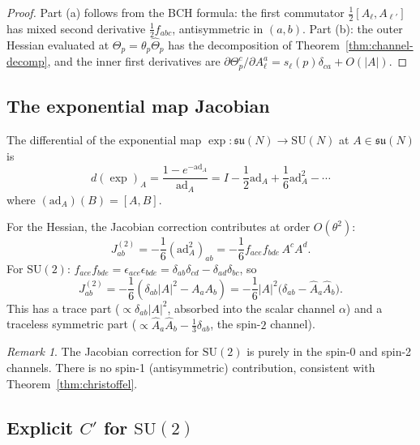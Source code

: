 \documentclass[11pt,a4paper]{article}
\theoremstyle{plain}
\theoremstyle{definition}
\theoremstyle{remark}
\newtheorem{remark}[theorem]{Remark}
\newcommand{\SU}{\mathrm{SU}}
\newcommand{\su}{\mathfrak{su}}
\newcommand{\ad}{\mathrm{ad}}
\begin{document}
\begin{proof}
Part (a) follows from the BCH formula: the first commutator
$\frac{1}{2}[A_\ell, A_{\ell'}]$ has mixed second derivative
$\frac{1}{2}f_{abc}$, antisymmetric in $(a,b)$. Part (b): the
outer Hessian evaluated at $\Theta_p = \theta_p\hat\Theta_p$
has the decomposition of Theorem~\ref{thm:channel-decomp}, and
the inner first derivatives are
$\partial\Theta_p^c/\partial A_\ell^a = s_\ell(p)\delta_{ca}
+ O(|A|)$.
\end{proof}


\subsection{The exponential map Jacobian}

The differential of the exponential map
$\exp: \su(N) \to \SU(N)$ at $A \in \su(N)$ is
\begin{equation}\label{eq:dexp}
d(\exp)_A = \frac{1 - e^{-\ad_A}}{\ad_A}
= I - \frac{1}{2}\ad_A + \frac{1}{6}\ad_A^2 - \cdots
\end{equation}
where $(\ad_A)(B) = [A,B]$.

For the Hessian, the Jacobian correction contributes at order
$O(\theta^2)$:
\begin{equation}
J^{(2)}_{ab} = -\frac{1}{6}(\ad_A^2)_{ab}
= -\frac{1}{6}f_{ace}f_{bde}\,A^c A^d.
\end{equation}
For $\SU(2)$: $f_{ace}f_{bde} = \epsilon_{ace}\epsilon_{bde}
= \delta_{ab}\delta_{cd} - \delta_{ad}\delta_{bc}$, so
\begin{equation}
J^{(2)}_{ab} = -\frac{1}{6}(\delta_{ab}|A|^2 - A_a A_b)
= -\frac{1}{6}|A|^2\bigl(\delta_{ab} - \hat A_a\hat A_b\bigr).
\end{equation}
This has a trace part ($\propto \delta_{ab}|A|^2$, absorbed into
the scalar channel $\alpha$) and a traceless symmetric part
($\propto \hat A_a\hat A_b - \frac{1}{3}\delta_{ab}$, the
spin-$2$ channel).

\begin{remark}
The Jacobian correction for $\SU(2)$ is purely in the spin-0 and
spin-2 channels. There is no spin-1 (antisymmetric) contribution,
consistent with Theorem~\ref{thm:christoffel}.
\end{remark}


\subsection{Explicit $C'$ for $\SU(2)$}
\end{document}
